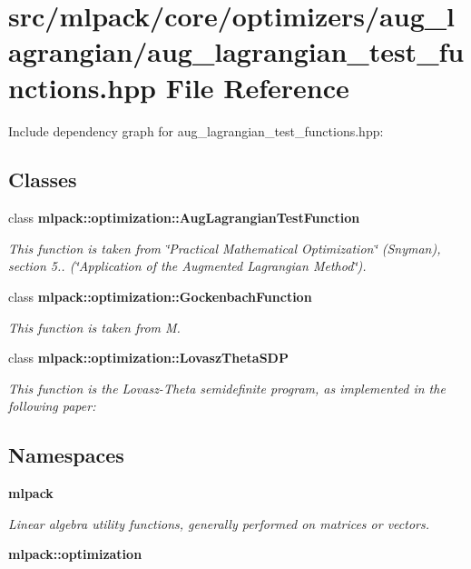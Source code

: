 \section{src/mlpack/core/optimizers/aug\-\_\-lagrangian/aug\-\_\-lagrangian\-\_\-test\-\_\-functions.hpp File Reference}
\label{aug__lagrangian__test__functions_8hpp}
Include dependency graph for aug\-\_\-lagrangian\-\_\-test\-\_\-functions.\-hpp\-:
\subsection*{Classes}
\begin{DoxyCompactItemize}
\item 
class {\bf mlpack\-::optimization\-::\-Aug\-Lagrangian\-Test\-Function}
\begin{DoxyCompactList}\small\item\em This function is taken from \char`\"{}\-Practical Mathematical Optimization\char`\"{} (Snyman), section 5.. (\char`\"{}\-Application of the Augmented Lagrangian Method\char`\"{}). \end{DoxyCompactList}\item 
class {\bf mlpack\-::optimization\-::\-Gockenbach\-Function}
\begin{DoxyCompactList}\small\item\em This function is taken from M. \end{DoxyCompactList}\item 
class {\bf mlpack\-::optimization\-::\-Lovasz\-Theta\-S\-D\-P}
\begin{DoxyCompactList}\small\item\em This function is the Lovasz-\/\-Theta semidefinite program, as implemented in the following paper\-: \end{DoxyCompactList}\end{DoxyCompactItemize}
\subsection*{Namespaces}
\begin{DoxyCompactItemize}
\item 
{\bf mlpack}
\begin{DoxyCompactList}\small\item\em Linear algebra utility functions, generally performed on matrices or vectors. \end{DoxyCompactList}\item 
{\bf mlpack\-::optimization}
\end{DoxyCompactItemize}


